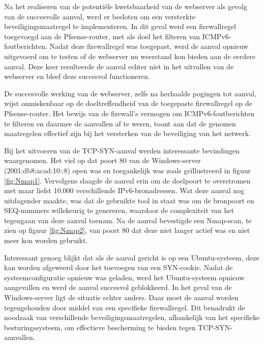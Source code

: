 Na het realiseren van de potentiële kwetsbaarheid van de webserver als gevolg van de succesvolle aanval, werd er besloten om een versterkte beveiligingsmaatregel te implementeren. In dit geval werd een firewallregel toegevoegd aan de Pfsense-router, met als doel het filteren van ICMPv6-foutberichten. Nadat deze firewallregel was toegepast, werd de aanval opnieuw uitgevoerd om te testen of de webserver nu weerstand kon bieden aan de eerdere aanval. Deze keer resulteerde de aanval echter niet in het uitvallen van de webserver en bleef deze succesvol functioneren.
\newline

De succesvolle werking van de webserver, zelfs na herhaalde pogingen tot aanval, wijst onmiskenbaar op de doeltreffendheid van de toegepaste firewallregel op de Pfsense-router. Het bewijs van de firewall's vermogen om ICMPv6-foutberichten te filteren en daarmee de aanvallen af te weren, toont aan dat de genomen maatregelen effectief zijn bij het versterken van de beveiliging van het netwerk.
\bigskip
\newline

Bij het uitvoeren van de TCP-SYN-aanval werden interessante bevindingen waargenomen. Het viel op dat poort 80 van de Windows-server (2001:db8:acad:10::8) open was en toegankelijk was zoals geïllustreerd in figuur \ref{fig:Nmap1}. Vervolgens slaagde de aanval erin om de doelpoort te overstromen met maar liefst 10.000 verschillende IPv6-bronadressen. Wat deze aanval nog uitdagender maakte, was dat de gebruikte tool in staat was om de bronpoort en SEQ-nummers willekeurig te genereren, waardoor de complexiteit van het tegengaan van deze aanval toenam. Na de aanval bevestigde een Nmap-scan, te zien op figuur \ref{fig:Nmap2}, van poort 80 dat deze niet langer actief was en niet meer kon worden gebruikt.
\newline

Interessant genoeg blijkt dat als de aanval gericht is op een Ubuntu-systeem, deze kan worden afgeweerd door het toevoegen van een SYN-cookie. Nadat de systeemconfiguratie opnieuw was geladen, werd het Ubuntu-systeem opnieuw aangevallen en werd de aanval succesvol geblokkeerd. In het geval van de Windows-server ligt de situatie echter anders. Daar moet de aanval worden tegengehouden door middel van een specifieke firewallregel. Dit benadrukt de noodzaak van verschillende beveiligingsmaatregelen, afhankelijk van het specifieke besturingssysteem, om effectieve bescherming te bieden tegen TCP-SYN-aanvallen.
\newline

